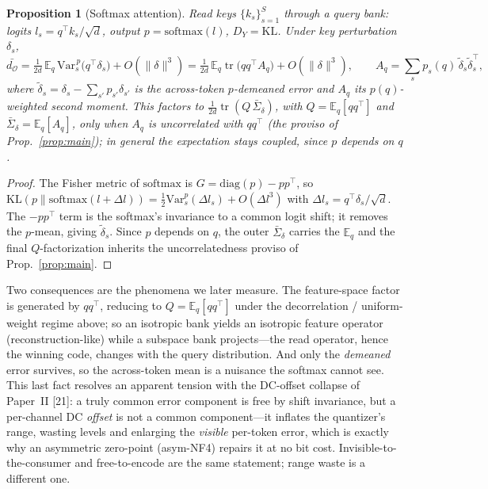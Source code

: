\documentclass[lettersize,onecolumn]{IEEEtran}
\newtheorem{proposition}{Proposition}
\theoremstyle{definition}
\theoremstyle{remark}
\newcommand{\tr}{\operatorname{tr}}
\newcommand{\dO}{d_{\mathcal{O}}}
\newcommand{\E}{\mathbb{E}}
\begin{document}
\begin{proposition}[Softmax attention]\label{prop:softmax}
Read keys $\{k_s\}_{s=1}^{S}$ through a query bank: logits $l_s=q^\top k_s/\sqrt{d}$,
output $p=\mathrm{softmax}(l)$, $D_Y=\mathrm{KL}$. Under key perturbation $\delta_s$,
\[
\bar{\dO}=\tfrac{1}{2d}\,\E_q\,\mathrm{Var}^{\,p}_s\!\big(q^\top\delta_s\big)
+O(\|\delta\|^3)
=\tfrac{1}{2d}\,\E_q\tr\!\big(qq^\top A_q\big)+O(\|\delta\|^3),
\qquad A_q=\sum_s p_s(q)\,\tilde\delta_s\tilde\delta_s^\top,
\]
where $\tilde\delta_s=\delta_s-\sum_{s'}p_{s'}\delta_{s'}$ is the across-token
$p$-demeaned error and $A_q$ its $p(q)$-weighted second moment. This
\emph{factors} to $\tfrac{1}{2d}\tr(Q\,\bar\Sigma_\delta)$, with $Q=\E_q[qq^\top]$
and $\bar\Sigma_\delta=\E_q[A_q]$, \emph{only} when $A_q$ is uncorrelated with
$qq^\top$ (the proviso of Prop.~\ref{prop:main}); in general the expectation stays
coupled, since $p$ depends on $q$.
\end{proposition}
\begin{proof}
The Fisher metric of $\mathrm{softmax}$ is $G=\mathrm{diag}(p)-pp^\top$, so
$\mathrm{KL}(p\|\mathrm{softmax}(l+\Delta l))=\tfrac12\mathrm{Var}^p_s(\Delta l_s)
+O(\Delta l^3)$ with $\Delta l_s=q^\top\delta_s/\sqrt d$. The $-pp^\top$ term is the
softmax's invariance to a common logit shift; it removes the $p$-mean, giving
$\tilde\delta_s$. Since $p$ depends on $q$, the outer $\bar\Sigma_\delta$ carries the
$\E_q$ and the final $Q$-factorization inherits the uncorrelatedness proviso of
Prop.~\ref{prop:main}.
\end{proof}
Two consequences are the phenomena we later measure. The feature-space factor is
generated by $qq^\top$, reducing to $Q=\E_q[qq^\top]$ under the decorrelation /
uniform-weight regime above; so an isotropic bank yields an isotropic feature
operator (reconstruction-like) while a subspace bank projects---the read operator,
hence the winning code, changes with the query distribution. And only the
\emph{demeaned} error survives, so the across-token mean is a nuisance the softmax
cannot see. This last fact resolves an apparent tension with the DC-offset
collapse of Paper~II [21]: a truly common error component is free by shift
invariance, but a per-channel DC \emph{offset} is not a common component---it inflates
the quantizer's range, wasting levels and enlarging the \emph{visible} per-token
error, which is exactly why an asymmetric zero-point (asym-NF4) repairs it at no bit
cost. Invisible-to-the-consumer and free-to-encode are the same statement; range
waste is a different one.
\end{document}

